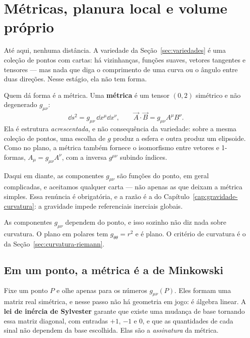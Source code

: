 \documentclass[12pt,a4paper,oneside]{book}
\theoremstyle{rgplain}
\theoremstyle{rgremark}
\begin{document}
\section{Métricas, planura local e volume próprio}
\label{sec:metrica-variedade}

Até aqui, nenhuma distância. A variedade da Seção~\ref{sec:variedades} é uma
coleção de pontos com cartas: há vizinhanças, funções suaves, vetores
tangentes e tensores --- mas nada que diga o comprimento de uma curva ou o
ângulo entre duas direções. Nesse estágio, ela não tem forma.

Quem dá forma é a métrica. Uma \textbf{métrica} é um tensor $(0,2)$ simétrico
e não degenerado $g_{\mu\nu}$:
\begin{equation}
  \dd s^2=g_{\mu\nu}\,\dd x^\mu\dd x^\nu ,
  \qquad
  \vec A\cdot\vec B=g_{\mu\nu}A^\mu B^\nu .
  \label{eq:metrica-variedade}
\end{equation}
Ela é estrutura \emph{acrescentada}, e não consequência da variedade: sobre a
mesma coleção de pontos, uma escolha de $g$ produz a esfera e outra produz um
elipsoide. Como no plano, a métrica também fornece o isomorfismo entre vetores
e 1-formas, $A_\mu=g_{\mu\nu}A^\nu$, com a inversa $g^{\mu\nu}$ subindo
índices.

Daqui em diante, as componentes $g_{\mu\nu}$ são funções do ponto, em geral
complicadas, e aceitamos qualquer carta --- não apenas as que deixam a métrica
simples. Essa renúncia é obrigatória, e a razão é a do
Capítulo~\ref{cap:gravidade-curvatura}: a gravidade impede referenciais
inerciais globais.

\begin{atencao}
As componentes $g_{\mu\nu}$ dependem do ponto, e isso sozinho não diz nada
sobre curvatura. O plano em polares tem $g_{\theta\theta}=r^2$ e é plano.
O critério de curvatura é o da Seção~\ref{sec:curvatura-riemann}.
\end{atencao}

\subsection*{Em um ponto, a métrica é a de Minkowski}

Fixe um ponto $P$ e olhe apenas para os números $g_{\mu\nu}(P)$. Eles formam
uma matriz real simétrica, e nesse passo não há geometria em jogo: é álgebra
linear. A \textbf{lei de inércia de Sylvester} garante que existe uma mudança
de base tornando essa matriz diagonal, com entradas $+1$, $-1$ e $0$, e que as
quantidades de cada sinal não dependem da base escolhida. Elas são a
\emph{assinatura} da métrica.
\end{document}

